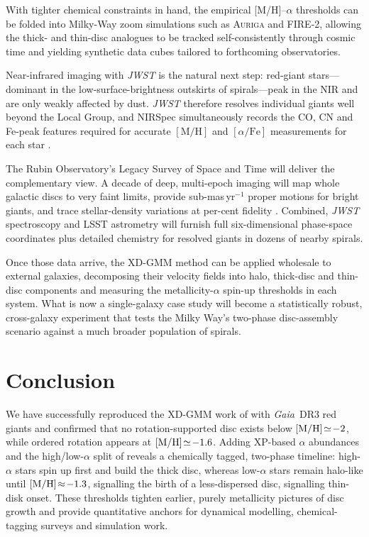 \documentclass[a4paper,12pt]{article}
\begin{document}
With tighter chemical constraints in hand, the empirical [M/H]–$\alpha$ thresholds can be folded 
into Milky-Way zoom simulations such as \textsc{Auriga} and \textsc{FIRE-2}, allowing the thick- 
and thin-disc analogues to be tracked self-consistently through cosmic time and yielding 
synthetic data cubes tailored to forthcoming observatories.  

Near-infrared imaging with \textit{JWST} is the natural next step: red-giant stars—dominant in 
the low-surface-brightness outskirts of spirals—peak in the NIR and are only weakly affected by 
dust.  \textit{JWST} therefore resolves individual giants well beyond the Local Group, and 
NIRSpec simultaneously records the CO, CN and Fe-peak features required for accurate 
\([\mathrm{M/H}]\) and \([\alpha/\mathrm{Fe}]\) measurements for each star \citep{Jakobsen_2022}.

The Rubin Observatory's Legacy Survey of Space and Time will deliver the complementary view.  
A decade of deep, multi-epoch imaging will map whole galactic discs to very faint limits, 
provide sub-mas\,yr\(^{-1}\) proper motions for bright giants, and trace stellar-density 
variations at per-cent fidelity \citep{Ivezic2019}.  Combined, \textit{JWST} spectroscopy 
and LSST astrometry will furnish full six-dimensional phase-space coordinates plus detailed 
chemistry for resolved giants in dozens of nearby spirals.  

Once those data arrive, the XD-GMM method can be applied 
wholesale to external galaxies, decomposing their velocity fields into halo, thick-disc and 
thin-disc components and measuring the metallicity-$\alpha$ spin-up thresholds in each system.  
What is now a single-galaxy case study will become a statistically robust, cross-galaxy 
experiment that tests the Milky Way's two-phase disc-assembly scenario against a much broader 
population of spirals.




\section{Conclusion}

We have successfully reproduced the XD-GMM work of \citet{zhang2024existencemetalpoordiscmilky} with
\textit{Gaia}~DR3 red giants and confirmed that no rotation-supported disc exists below
${\rm [M/H]}\!\simeq\!-2$, while ordered rotation appears at
${\rm [M/H]}\!\simeq\!-1.6$.  Adding XP-based $\alpha$ abundances
\citep{Li2024} and the high/low-$\alpha$ split of \citet{Vis2024} reveals a chemically
tagged, two-phase timeline: high-$\alpha$ stars spin up first and build the thick disc,
whereas low-$\alpha$ stars remain halo-like until ${\rm [M/H]}\!\approx\!-1.3$, signalling
the birth of a less-dispersed disc, signalling thin-disk onset.  These thresholds tighten 
earlier, purely metallicity pictures of disc growth and provide quantitative anchors for 
dynamical modelling, chemical-tagging surveys and simulation work.
\end{document}
